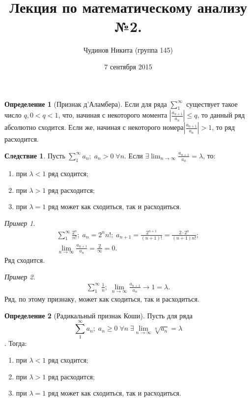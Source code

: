 \documentclass[a4paper,12pt]{article}
\theoremstyle{remark}
\newtheorem*{example}{Пример}
\theoremstyle{definition}
\newtheorem{definition}{Определение}
\newtheorem*{effect}{Следствие}
\begin{document}
\sloppy
\author{Чудинов Никита (группа 145)}
\date{7 сентября 2015}
\title{\vspace{-2.0cm}Лекция по математическому анализу №2.}
\frenchspacing
 
\maketitle


\begin{definition}[Признак д'Аламбера]
	Если для ряда \(\sum_{1}^{\infty}\) существует такое число \(q, {0 < q < 1}\), что, начиная с некоторого момента \(\left| \frac{a_{n+1}}{a_n}\right| \leqslant q \), то данный ряд абсолютно сходится. Если же, начиная с некоторого номера\(\left| \frac{a_{n+1}}{a_n}\right| > 1\), то ряд расходится.
\end{definition}

\begin{effect}
	Пусть \(\sum_{1}^{\infty} a_n;\; a_n > 0 \;\forall n\).
	Если \(\exists \lim_{n \rightarrow \infty} \frac{a_{n+1}}{a_n} = \lambda\), то:
	\begin{enumerate}
		\item при \(\lambda < 1\) ряд сходится;
		\item при \(\lambda > 1\) ряд расходится;
		\item при \(\lambda = 1\) ряд может как сходиться, так и расходиться.
	\end{enumerate}
\end{effect}

\begin{example}
	\begin{gather*}
		\sum_1^\infty \frac{2^n}{n!};\; a_n = {2^n}{n!};\; a_{n+1} = \frac{2^{n+1}}{(n + 1)!} = \frac{2 \cdot 2^n}{(n + 1)n!}; \\
		\lim_{n \rightarrow \infty} \frac{a_{n+1}}{a_n} = \frac{2}{\infty} = 0.
	\end{gather*}
	Ряд сходится.
\end{example}

\begin{example}
	\begin{gather*}
		\sum_1^\infty \frac{1}{n};\; \lim_{n \rightarrow \infty} \frac{a_{n+1}}{a_n} \rightarrow 1 = \lambda.
	\end{gather*}
	Ряд, по этому признаку, может как сходиться, так и расходиться.
\end{example}

\begin{definition}[Радикальный признак Коши]
	Пусть для ряда \[\sum_1^{\infty} a_n;\; a_n \geqslant 0 \;\forall n \;\exists \lim_{n \rightarrow \infty} \sqrt[n]{a_n} = \lambda\].
	Тогда:
	\begin{enumerate}
		\item при \(\lambda < 1\) ряд сходится;
		\item при \(\lambda > 1\) ряд расходится;
		\item при \(\lambda = 1\) ряд может как сходиться, так и расходиться.
	\end{enumerate}
\end{definition}
\end{document}
